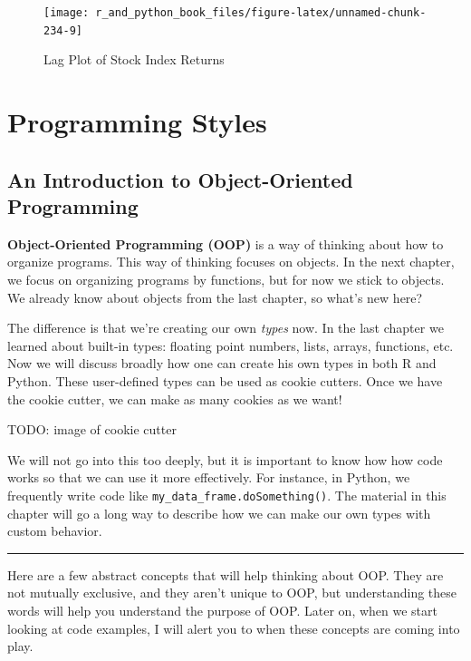 \documentclass[
  12pt,
  krantz2]{krantz}
\begin{document}
\begin{figure}
\texttt{[image: r\_and\_python\_book\_files/figure-latex/unnamed-chunk-234-9]} \caption{Lag Plot of Stock Index Returns}\label{fig:unnamed-chunk-234}
\end{figure}

\hypertarget{part-programming-styles}{%
\part{Programming Styles}\label{part-programming-styles}}

\hypertarget{an-introduction-to-object-oriented-programming}{%
\chapter{An Introduction to Object-Oriented Programming}\label{an-introduction-to-object-oriented-programming}}

\textbf{Object-Oriented Programming (OOP)} is a way of thinking about how to organize programs. This way of thinking focuses on objects. In the next chapter, we focus on organizing programs by functions, but for now we stick to objects. We already know about objects from the last chapter, so what's new here?

The difference is that we're creating our own \emph{types} now. In the last chapter we learned about built-in types: floating point numbers, lists, arrays, functions, etc. Now we will discuss broadly how one can create his own types in both R and Python. These user-defined types can be used as cookie cutters. Once we have the cookie cutter, we can make as many cookies as we want!

TODO: image of cookie cutter

We will not go into this too deeply, but it is important to know how how code works so that we can use it more effectively. For instance, in Python, we frequently write code like \texttt{my\_data\_frame.doSomething()}. The material in this chapter will go a long way to describe how we can make our own types with custom behavior.

\begin{center}\rule{0.5\linewidth}{0.5pt}\end{center}

Here are a few abstract concepts that will help thinking about OOP. They are not mutually exclusive, and they aren't unique to OOP, but understanding these words will help you understand the purpose of OOP. Later on, when we start looking at code examples, I will alert you to when these concepts are coming into play.
\end{document}
